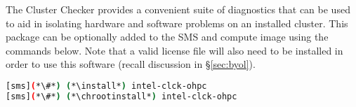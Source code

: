 The \Intel{} Cluster Checker provides a convenient suite of diagnostics that
can be used to aid in isolating hardware and software problems on an installed
cluster. This package can be optionally added to the SMS and compute image
using the commands below. Note that a valid license file will also need to be
installed in order to use this software (recall discussion in \S\ref{sec:byol}).

\begin{lstlisting}[language=bash,keywords={}]
[sms](*\#*) (*\install*) intel-clck-ohpc
[sms](*\#*) (*\chrootinstall*) intel-clck-ohpc
\end{lstlisting}
